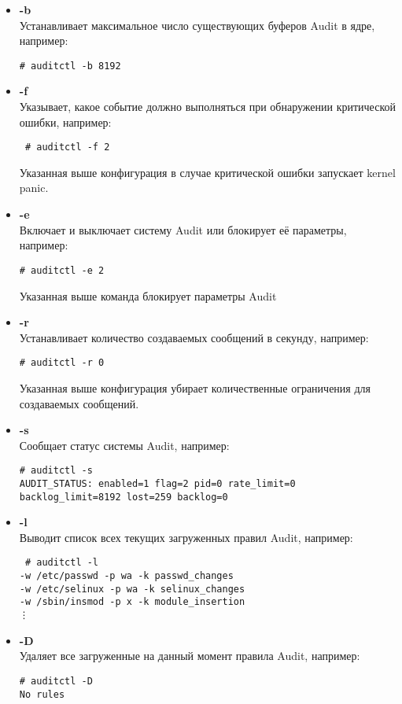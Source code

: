 \documentclass[a4paper,10pt,twoside]{article}
\begin{document}
\begin{itemize}
 \item \textbf{-b}\\
Устанавливает максимальное число существующих буферов Audit в ядре, например:
\begin{verbatim}
# auditctl -b 8192
\end{verbatim} 
\item \textbf{-f}\\
Указывает, какое событие должно выполняться при обнаружении критической ошибки, например:
\begin{verbatim}
 # auditctl -f 2
\end{verbatim} 
Указанная выше конфигурация в случае критической ошибки запускает kernel panic.
\item \textbf{-e}\\
Включает и выключает систему Audit или блокирует её параметры, например:
\begin{verbatim}
# auditctl -e 2
\end{verbatim} 
Указанная выше команда блокирует параметры Audit 
\item \textbf{-r}\\
Устанавливает количество создаваемых сообщений в секунду, например:
\begin{verbatim}
# auditctl -r 0
\end{verbatim} 
Указанная выше конфигурация убирает количественные ограничения для создаваемых сообщений.
\item \textbf{-s}\\
Сообщает статус системы Audit, например: 
\begin{verbatim}
# auditctl -s
AUDIT_STATUS: enabled=1 flag=2 pid=0 rate_limit=0 backlog_limit=8192 lost=259 backlog=0
\end{verbatim} 
\item \textbf{-l}\\
Выводит список всех текущих загруженных правил Audit, например: 
\begin{verbatim}
 # auditctl -l
-w /etc/passwd -p wa -k passwd_changes
-w /etc/selinux -p wa -k selinux_changes
-w /sbin/insmod -p x -k module_insertion
⋮
\end{verbatim} 
\item \textbf{-D}\\
Удаляет все загруженные на данный момент правила Audit, например: 
\begin{verbatim}
# auditctl -D
No rules
\end{verbatim} 
\end{itemize}
\end{document}
